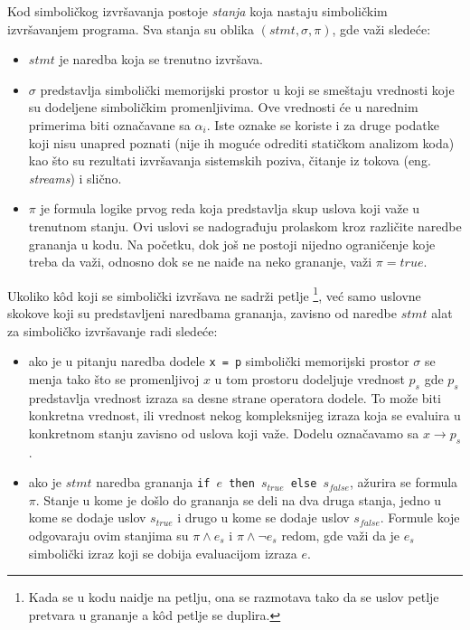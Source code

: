 \documentclass[12pt,oneside]{memoir}
\begin{document}
Kod simboličkog izvršavanja postoje \textit{stanja} koja nastaju simboličkim izvršavanjem programa. Sva stanja su oblika $(stmt, \sigma, \pi)$, gde važi sledeće:

\begin{itemize}
    \item $stmt$ je naredba koja se trenutno izvršava.
    
    \item $\sigma$ predstavlja simbolički memorijski prostor u koji se smeštaju vrednosti koje su dodeljene simboličkim promenljivima. Ove vrednosti će u narednim primerima biti označavane sa $\alpha_i$. Iste oznake se koriste i za druge podatke koji nisu unapred poznati (nije ih moguće odrediti statičkom analizom koda) kao što su rezultati izvršavanja sistemskih poziva, čitanje iz tokova (eng. \textit{streams}) i slično.
    
    \item $\pi$ je formula logike prvog reda koja predstavlja skup uslova koji važe u trenutnom stanju. Ovi uslovi se nadograđuju prolaskom kroz različite naredbe grananja u kodu. Na početku, dok još ne postoji nijedno ograničenje koje treba da važi, odnosno dok se ne naiđe na neko grananje, važi $\pi = true$. 
\end{itemize}

Ukoliko k\^od koji se simbolički izvršava ne sadrži petlje \footnote[1]{Kada se u kodu naidje na petlju, ona se razmotava tako da se uslov petlje pretvara u grananje a k\^od petlje se duplira.}, već samo uslovne skokove koji su predstavljeni naredbama grananja, zavisno od naredbe $stmt$ alat za simboličko izvršavanje radi sledeće:

\begin{itemize}
    \item ako je u pitanju naredba dodele \texttt{x = p} simbolički memorijski prostor $\sigma$ se menja tako što se promenljivoj $x$ u tom prostoru dodeljuje vrednost $p_s$ gde $p_s$ predstavlja vrednost izraza sa desne strane operatora dodele. To može biti konkretna vrednost, ili vrednost nekog kompleksnijeg izraza koja se evaluira u konkretnom stanju zavisno od uslova koji važe. Dodelu označavamo sa $x \rightarrow p_s$.
    
    \item ako je $stmt$ naredba grananja \texttt{if $e$ then $s_{true}$ else $s_{false}$}, ažurira se formula $\pi$. Stanje u kome je došlo do grananja se deli na dva druga stanja, jedno u kome se dodaje uslov $s_{true}$ i drugo u kome se dodaje uslov $s_{false}$. Formule koje odgovaraju ovim stanjima su $\pi \land e_s$ i $\pi \land \neg e_s$ redom, gde važi da je $e_s$ simbolički izraz koji se dobija evaluacijom izraza $e$.
\end{itemize}
\end{document}
